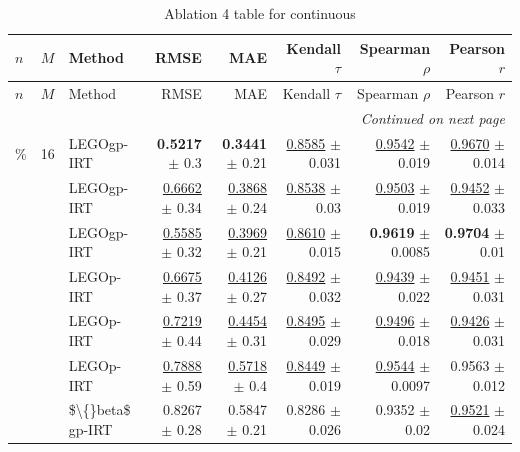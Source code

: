 \footnotesize
\setlength{\tabcolsep}{2pt}
\renewcommand{\arraystretch}{1.05}
\setlength{\LTpre}{0pt}
\setlength{\LTpost}{0pt}
\setlength{\LTleft}{\fill}
\setlength{\LTright}{\fill}
\begin{longtable}{llp{}rrrrr}
\caption{Ablation 4 table for continuous}\label{tab:ablation\_4\_continuous}\\
\toprule
$n$ & $M$ & Method & RMSE & MAE & Kendall $\tau$ & Spearman $\rho$ & Pearson $r$ \\
\midrule
\endfirsthead
\toprule
$n$ & $M$ & Method & RMSE & MAE & Kendall $\tau$ & Spearman $\rho$ & Pearson $r$ \\
\midrule
\endhead
\midrule
\multicolumn{8}{r}{\emph{Continued on next page}} \\
\midrule
\endfoot
\bottomrule
\endlastfoot
5\% & 16 & LEGOgp-IRT & \textbf{0.5217} {\scriptsize $\pm$ 0.3} & \textbf{0.3441} {\scriptsize $\pm$ 0.21} & \underline{0.8585} {\scriptsize $\pm$ 0.031} & \underline{0.9542} {\scriptsize $\pm$ 0.019} & \underline{0.9670} {\scriptsize $\pm$ 0.014} \\
 &  & LEGOgp-IRT & \underline{0.6662} {\scriptsize $\pm$ 0.34} & \underline{0.3868} {\scriptsize $\pm$ 0.24} & \underline{0.8538} {\scriptsize $\pm$ 0.03} & \underline{0.9503} {\scriptsize $\pm$ 0.019} & \underline{0.9452} {\scriptsize $\pm$ 0.033} \\
 &  & LEGOgp-IRT & \underline{0.5585} {\scriptsize $\pm$ 0.32} & \underline{0.3969} {\scriptsize $\pm$ 0.21} & \underline{0.8610} {\scriptsize $\pm$ 0.015} & \textbf{0.9619} {\scriptsize $\pm$ 0.0085} & \textbf{0.9704} {\scriptsize $\pm$ 0.01} \\
 &  & LEGOp-IRT & \underline{0.6675} {\scriptsize $\pm$ 0.37} & \underline{0.4126} {\scriptsize $\pm$ 0.27} & \underline{0.8492} {\scriptsize $\pm$ 0.032} & \underline{0.9439} {\scriptsize $\pm$ 0.022} & \underline{0.9451} {\scriptsize $\pm$ 0.031} \\
 &  & LEGOp-IRT & \underline{0.7219} {\scriptsize $\pm$ 0.44} & \underline{0.4454} {\scriptsize $\pm$ 0.31} & \underline{0.8495} {\scriptsize $\pm$ 0.029} & \underline{0.9496} {\scriptsize $\pm$ 0.018} & \underline{0.9426} {\scriptsize $\pm$ 0.031} \\
 &  & LEGOp-IRT & \underline{0.7888} {\scriptsize $\pm$ 0.59} & \underline{0.5718} {\scriptsize $\pm$ 0.4} & \underline{0.8449} {\scriptsize $\pm$ 0.019} & \underline{0.9544} {\scriptsize $\pm$ 0.0097} & 0.9563 {\scriptsize $\pm$ 0.012} \\
 &  & \$\textbackslash\{\}beta\$ gp-IRT & 0.8267 {\scriptsize $\pm$ 0.28} & 0.5847 {\scriptsize $\pm$ 0.21} & 0.8286 {\scriptsize $\pm$ 0.026} & 0.9352 {\scriptsize $\pm$ 0.02} & \underline{0.9521} {\scriptsize $\pm$ 0.024} \\

\end{longtable}
